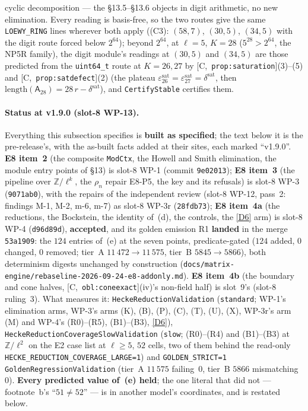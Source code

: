 \documentclass[11pt]{article}
\theoremstyle{remark}
\newcommand{\Z}{\mathbb{Z}}
\newcommand{\HA}[1]{[C,~\texttt{#1}]}      %
\begin{document}
\begin{enumerate}
  cyclic decomposition --- the \S13.5--\S13.6 objects in digit arithmetic, no new elimination. Every reading is basis-free, so the two routes give the
  same \texttt{LOEWY\_RING} lines wherever both apply ((C3): $(58,7)$, $(30,5)$, $(34,5)$ with the digit route forced below $2^{64}$); beyond $2^{64}$,
  at $\ell=5$, $K=28$ ($5^{28}>2^{64}$, the NP5R family), the digit module's readings at $(30,5)$ and $(34,5)$ are those predicted from the
  \texttt{uint64\_t} route at $K=26,27$ by \HA{prop:saturation}(3)--(5) and \HA{prop:satdefect}(2) (the plateau $\varepsilon^{\mathrm{sat}}_{26}=
  \varepsilon^{\mathrm{sat}}_{27}=\delta^{\mathrm{sat}}$, then $\mathrm{length}(\mathsf A_{28})=28\,r-\delta^{\mathrm{sat}}$), and \texttt{CertifyStable} certifies them.
\end{enumerate}

\paragraph{Status at v1.9.0 (slot-8 WP-13).} Everything this subsection specifies is
\textbf{built as specified}; the text below it is the pre-release's, with the as-built facts
added at their sites, each marked ``v1.9.0''. \textbf{E8 item~2} (the composite
\texttt{ModCtx}, the Howell and Smith elimination, the module entry points of \S13) is slot-8 WP-1
(commit \texttt{9e02013}); \textbf{E8 item~3} (the pipeline over $\Z/\ell^k$, the $\rho_n$ repair
E8-P5, the key and its refusals) is slot-8 WP-3 (\texttt{9071ab0}), with the repairs of the
independent review (slot-8 WP-12, pass~2: findings M-1, M-2, m-6, m-7) as slot-8 WP-3r
(\texttt{28fdb73}); \textbf{E8 item~4a} (the reductions, the Bockstein, the identity of~(d), the
controls, the \ref{D6} arm) is slot-8 WP-4 (\texttt{d96d89d}), \textbf{accepted}, and its golden
emission R1 \textbf{landed} in the merge \texttt{53a1909}: the $124$ entries of~(e) at the seven
points, predicate-gated ($124$ added, $0$ changed, $0$ removed; tier~A $11\,472\to11\,575$, tier~B
$5845\to5866$), both determinism digests unchanged by construction
(\texttt{docs/matrix-engine/rebaseline-2026-09-24-e8-addonly.md}). \textbf{E8 item~4b} (the
boundary and cone halves, \HA{obl:coneexact}(iv)'s non-field half) is slot~9's (slot-8 ruling~3).
What measures it: \texttt{HeckeReductionValidation} (\texttt{standard}; WP-1's elimination arms,
WP-3's arms (K), (B), (P), (C), (T), (U), (X), WP-3r's arm (M) and WP-4's (R0)--(R5), (B1)--(B3),
\ref{D6}), \texttt{HeckeReductionCoverageSlowValidation} (\texttt{slow}; (R0)--(R4) and
(B1)--(B3) at $\Z/\ell^2$ on the E2 case list at $\ell\ge5$, $52$ cells, two of them behind the
read-only \texttt{HECKE\_REDUCTION\_COVERAGE\_LARGE=1}) and
\texttt{GOLDEN\_STRICT=1 GoldenRegressionValidation} (tier~A $11\,575$ failing~$0$, tier~B $5866$
mismatching~$0$). \textbf{Every predicted value of~(e) held}; the one literal that did not ---
footnote~b's ``$51\ne52$'' --- is in another model's coordinates, and is restated below.
\end{document}
